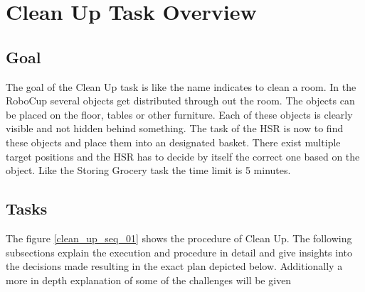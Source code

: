 \documentclass[main.tex]{subfiles}
\begin{document}
	\begingroup

	\renewcommand{\cleardoublepage}{}

	\renewcommand{\clearpage}{}

	\chapter{Clean Up Task Overview}

		
		\section{Goal}
		The goal of the Clean Up task is like the name indicates to clean a room. In the RoboCup several objects get distributed through out the room. The objects can be placed on the floor, tables or other furniture. Each of these objects is clearly visible and not hidden behind something. The task of the HSR is now to find these objects and place them into an designated basket. There exist multiple target positions and the HSR has to decide by itself the correct one based on the object. Like the Storing Grocery task the time limit is 5 minutes.

	  	\section{Tasks}
	  	The figure \ref{clean_up_seq_01} shows the procedure of Clean Up. The following subsections explain the execution and procedure in detail and give insights into the decisions made resulting in the exact plan depicted below. Additionally a more in depth explanation of some of the challenges will be given 	
\end{document}
